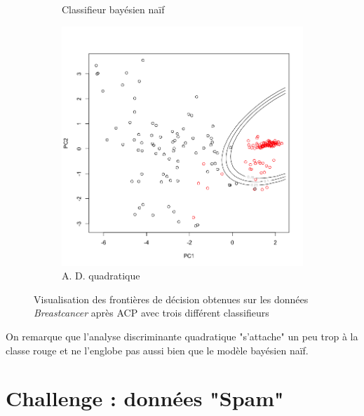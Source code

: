 \documentclass[a4paper,10pt]{report}
\begin{document}
\begin{figure}[H]
\begin{subfigure}[b]{0.33\linewidth}
		\caption{\small Classifieur bayésien naïf}
	\end{subfigure}%
	\begin{subfigure}[b]{0.33\linewidth}
		\centering
		\captionsetup{justification=centering, margin=0cm}
		\includegraphics[width=1\linewidth]{img/2-3-3-front-ACP-breastcancer-adq}
		\caption{\small A. D. quadratique}
	\end{subfigure}%
	\caption{\small Visualisation des frontières de décision obtenues sur les données \textit{Breastcancer} après ACP avec trois différent classifieurs}
	\label{fig:2-3-3-front-ACP-breastcancer}%
\end{figure}

On remarque que l'analyse discriminante quadratique "s'attache" un peu trop à la classe rouge et ne l'englobe pas aussi bien que le modèle bayésien naïf.








\chapter{Challenge : données "Spam"}
\end{document}
